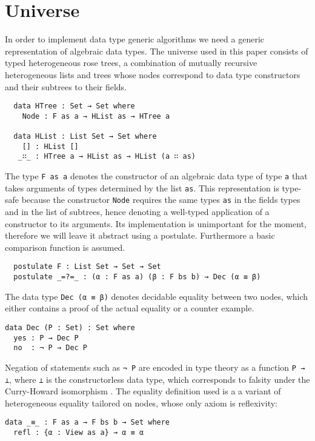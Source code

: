 \documentclass[preprint]{sigplanconf}
\begin{document}
\section{Universe}
In order to implement data type generic algorithms we need a generic representation of algebraic data types.
The universe used in this paper consists of typed heterogeneous rose trees,
a combination of mutually recursive heterogeneous lists and trees
whose nodes correspond to data type constructors and their subtrees
to their fields.
\begin{verbatim}
  data HTree : Set → Set where
    Node : F as a → HList as → HTree a

  data HList : List Set → Set where
    [] : HList []
   _∷_ : HTree a → HList as → HList (a ∷ as)
\end{verbatim}
	The type \texttt{F as a} denotes the constructor of an algebraic data
	type of type \texttt{a} that takes arguments of types determined by the list 
	\texttt{as}. This representation is type-safe because the constructor
	\texttt{Node} requires the same types \texttt{as} in the fields types and in 
	the list of subtrees, hence denoting a 	well-typed application of a 
	constructor to its arguments.
	Its implementation is unimportant for the moment, therefore we will leave it
	abstract using a postulate. Furthermore a basic comparison
	function is assumed.
\begin{verbatim}
  postulate F : List Set → Set → Set 
  postulate _=?=_ : (α : F as a) (β : F bs b) → Dec (α ≡ β)
\end{verbatim}
	The data type \texttt{Dec (α ≡ β)} denotes decidable equality between
	two nodes, which either contains a proof of the actual equality
	or a counter example.
\begin{verbatim}
data Dec (P : Set) : Set where
  yes : P → Dec P
  no  : ¬ P → Dec P
\end{verbatim}
	Negation of statements such as \texttt{¬ P} are encoded in type theory as
	a function \texttt{P → ⊥}, where \texttt{⊥} is
	the constructorless data type, which corresponds to falsity 
	under the Curry-Howard isomorphism \cite{PropositionAsTypes}.
	The equality definition used is a a variant of heterogeneous equality
	tailored on nodes, whose only axiom is reflexivity:
\begin{verbatim}
data _≡_ : F as a → F bs b → Set where
  refl : {α : View as a} → α ≡ α
\end{verbatim}
\end{document}
